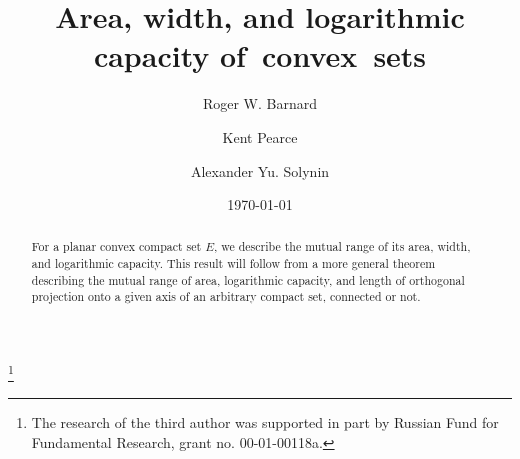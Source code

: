 \documentclass[11pt]{pjm}
\begin{document}
\title{Area, width, and logarithmic capacity of~convex~sets}

\author{Roger W. Barnard}
\address{Department of Mathematics and Statistics, Texas Tech University, Lubbock, TX 79409}

\author{Kent Pearce}
\address{Department of Mathematics and Statistics, Texas Tech University, Lubbock, TX 79409}

\author{Alexander Yu. Solynin}
\address{Steklov Institute of Mathematics at St. Petersburg, Russian Academy of Sciences, Fontanka 27, St.Petersburg, 191011, Russia}
\thanks{
The research of the third author was supported in part by Russian Fund for Fundamental Research, grant no. 00-01-00118a.}


\date{\today}

\dedicatory{}



\begin{abstract}
For a planar convex compact set $E$, we describe the mutual range of its area, 
width, and logarithmic capacity. This result will follow from a more general theorem describing the mutual
range of area, logarithmic capacity, and length of orthogonal projection onto a given axis of an arbitrary compact set,
connected or not.
\end{abstract}


\maketitle
\end{document}

